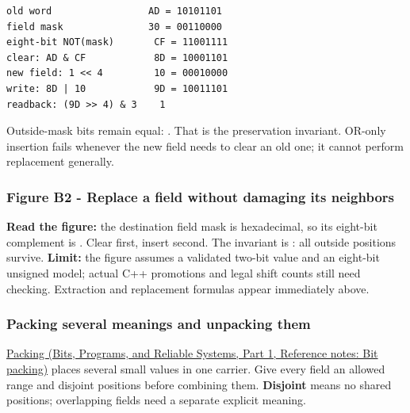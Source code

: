 \begin{verbatim}
old word                 AD = 10101101
field mask               30 = 00110000
eight-bit NOT(mask)       CF = 11001111
clear: AD & CF            8D = 10001101
new field: 1 << 4         10 = 00010000
write: 8D | 10            9D = 10011101
readback: (9D >> 4) & 3    1
\end{verbatim}

Outside-mask bits remain equal: . That is the preservation invariant. OR-only insertion fails whenever the new field needs to clear an old one; it cannot perform replacement generally.

\subsubsection{Figure B2 - Replace a field without damaging its neighbors}\label{05-engine-i-ch001-figure-b2---replace-a-field-without-damaging-its-neighbors}

\hypertarget{05-engine-i-ch001-figure-b2---replace-a-field-without-damaging-its-neighbors}{}


\textbf{Read the figure:} the destination field mask is  hexadecimal, so its eight-bit complement is . Clear first, insert second. The invariant is : all outside positions survive. \textbf{Limit:} the figure assumes a validated two-bit value and an eight-bit unsigned model; actual C++ promotions and legal shift counts still need checking. Extraction and replacement formulas appear immediately above.

\subsubsection{Packing several meanings and unpacking them}\label{05-engine-i-ch001-packing-several-meanings-and-unpacking-them}

\hypertarget{05-engine-i-ch001-packing-several-meanings-and-unpacking-them}{}

\href{../01-Bits-Programs-and-Reliable-Systems-P01/main.pdf\#nameddest=appendix-1f9963e1a5d1}{Packing (Bits, Programs, and Reliable Systems, Part 1, Reference notes: Bit packing)} places several small values in one carrier. Give every field an allowed range and disjoint positions before combining them. \textbf{Disjoint} means no shared positions; overlapping fields need a separate explicit meaning.

